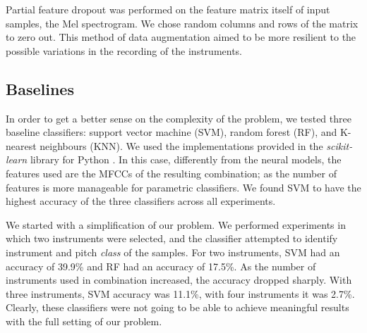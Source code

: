 \documentclass[runningheads,a4paper]{llncs}
\begin{document}
Partial feature dropout was performed on the feature matrix itself of input samples, the Mel spectrogram. We chose random columns and rows of the matrix to zero out. %
This method of data augmentation aimed to be more resilient to the possible variations in the recording of the instruments.

\subsection{Baselines}
\label{sec:baseline}

In order to get a better sense on the complexity of the problem, we tested three baseline classifiers: support vector machine (SVM), random forest (RF), and K-nearest neighbours (KNN). We used the implementations provided in the \emph{scikit-learn }library for Python \cite{scikit-learn}. 
In this case, differently from the neural models, the features used are the MFCCs of the resulting combination; as the number of features is more manageable for parametric classifiers. We found SVM to have the highest accuracy of the three classifiers across all experiments.

We started with a simplification of our problem. We performed experiments in which two instruments were selected, and the classifier attempted to identify instrument and pitch \emph{class} of the samples. For two instruments, SVM had an accuracy of 39.9\% and RF had an accuracy of 17.5\%. As the number of instruments used in combination increased, the accuracy dropped sharply. With three instruments, SVM accuracy was 11.1\%, with four instruments it was 2.7\%. Clearly, these classifiers were not going to be able to achieve meaningful results with the full setting of our problem.
\end{document}
